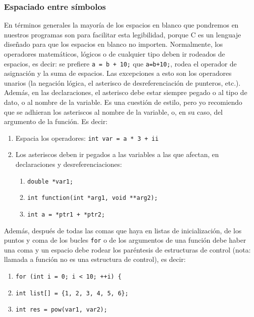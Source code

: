 \documentclass[a4paper]{article}
\begin{document}
\subsubsection{Espaciado entre símbolos}
En términos generales la mayoría de los espacios en blanco que pondremos en
nuestros programas son para facilitar esta legibilidad, porque C es un lenguaje
diseñado para que los espacios en blanco no importen. Normalmente,
los operadores matemáticos, lógicos o de cualquier tipo deben ir rodeados de
espacios, es decir: se prefiere \lstinline[style=C]!a = b + 10;!
que \lstinline[style=C]!a=b+10;!,
rodea el operador de asignación y la suma de espacios. Las excepciones a esto
son los operadores unarios (la negación lógica, el asterisco de
desreferenciación de punteros, etc.). Además, en las declaraciones, el asterisco
debe estar siempre pegado o al tipo de dato, o al nombre de la variable. Es una
cuestión de estilo, pero yo recomiendo que se adhieran los asteriscos al nombre
de la variable, o, en su caso, del argumento de la función.
Es decir:
\begin{enumerate}
\item Espacia los operadores: \lstinline[style=C]!int var = a * 3 + ii!
\item Los asteriscos deben ir pegados a las variables a las que afectan, en
declaraciones y desreferenciaciones:
\begin{enumerate}
\item \lstinline[style=C]!double *var1;!
\item \lstinline[style=C]!int function(int *arg1, void **arg2);!
\item \lstinline[style=C]!int a = *ptr1 + *ptr2;!
\end{enumerate}
\end{enumerate}

Además, después de todas las comas que haya en listas de inicialización,
de los puntos y coma de los bucles \verb!for! o de los argumentos de una función
debe haber una coma y un espacio debe rodear los paréntesis de estructuras
de control (nota: llamada a función no es una estructura de control), es decir:

\begin{enumerate}
\item \lstinline[style=C]!for (int i = 0; i < 10; ++i)!\verb! {!
\item \lstinline[style=C]!int list[] = {1, 2, 3, 4, 5, 6};!
\item \lstinline[style=C]!int res = pow(var1, var2);!
\end{enumerate}
\end{document}
